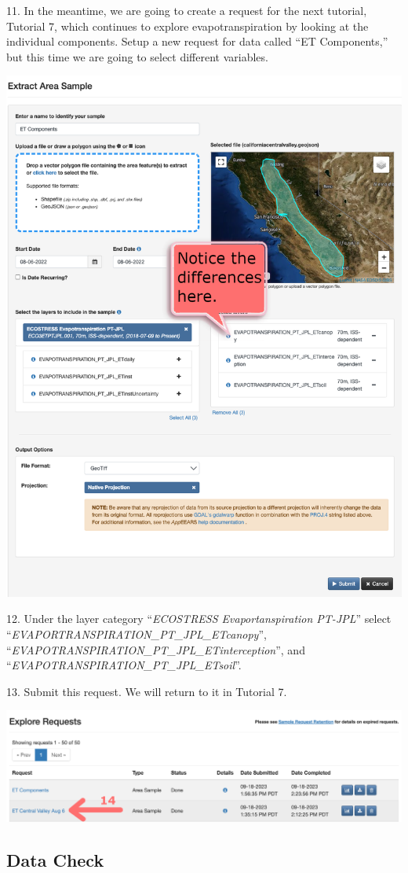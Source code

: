 \documentclass[oneside,a4paper,11pt,explicit]{book}
\begin{document}
11. In the meantime, we are going to create a request for the next tutorial, Tutorial 7, which continues to explore evapotranspiration by looking at the individual components. Setup a new request for data called ``ET Components,'' but this time we are going to select different variables. 

\vspace{.5em}

\centerline{\includegraphics[width=.6\textwidth]{ETcomponentRequest.png}}

\vspace{.5em}

12. Under the layer category ``\textit{ECOSTRESS Evaportanspiration PT-JPL}'' select ``\textit{EVAPORTRANSPIRATION\_PT\_JPL\_ETcanopy}'', ``\textit{EVAPOTRANSPIRATION\_PT\_JPL\_ETinterception}'', and ``\textit{EVAPOTRANSPIRATION\_PT\_JPL\_ETsoil}''.

13. Submit this request. We will return to it in Tutorial 7.

\vspace{.5em}

\centerline{\includegraphics[width=.6\textwidth]{ExploreComplete.png}}

\vspace{.5em}

\subsection{Data Check}
\end{document}
